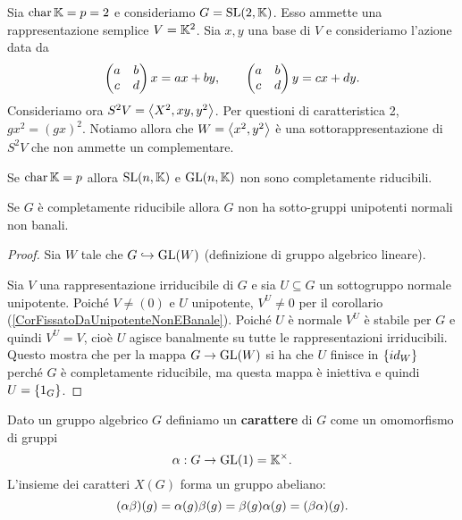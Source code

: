 \begin{example}
Sia $\operatorname{char} \mathbb{K}=p=2$ e consideriamo $G=\mathrm{SL}(2,\mathbb{K})$. Esso ammette una rappresentazione semplice $V=\mathbb{K}^2$. Sia $x,y$ una base di $V$ e consideriamo l'azione data da
\[\begin{pmatrix}a&b\\c&d\end{pmatrix}x=ax+by,\qquad \begin{pmatrix}a&b\\c&d\end{pmatrix}y=cx+dy.\]
Consideriamo ora $S^2V=\left\langle {X^2,xy,y^2}\right\rangle$. Per questioni di caratteristica 2, $gx^2=(gx)^2$. Notiamo allora che $W=\left\langle {x^2,y^2}\right\rangle$ \`e una sottorappresentazione di $S^2V$ che non ammette un complementare.
\end{example}

\begin{exercise}
Se $\operatorname{char} \mathbb{K}=p$ allora $\mathrm{SL}(n,\mathbb{K})$ e $\mathrm{GL}(n,\mathbb{K})$ non sono completamente riducibili.
\end{exercise}




\begin{proposition}\label{PrCompletamenteRiducibileNonHaSottogruppiNormaliUnipotenti}
Se $G$ \`e completamente riducibile allora $G$ non ha sotto-gruppi unipotenti normali non banali.
\end{proposition}
\begin{proof}
Sia $W$ tale che $G\hookrightarrow \mathrm{GL}(W)$ (definizione di gruppo algebrico lineare).

Sia $V$ una rappresentazione irriducibile di $G$ e sia $U\subseteq G$ un sottogruppo normale unipotente. Poich\'e $V\neq (0)$ e $U$ unipotente, $V^U\neq 0$ per il corollario (\ref{CorFissatoDaUnipotenteNonEBanale}). Poich\'e $U$ \`e normale $V^U$ \`e stabile per $G$ e quindi $V^U=V$, cio\`e $U$ agisce banalmente su tutte le rappresentazioni irriducibili. Questo mostra che per la mappa $G\to \mathrm{GL}(W)$ si ha che $U$ finisce in $\left\{{id_W}\right\}$ perch\'e $G$ \`e completamente riducibile, ma questa mappa \`e iniettiva e quindi $U=\left\{{1_G}\right\}$.
\end{proof}



\begin{definition}
Dato un gruppo algebrico $G$ definiamo un \textbf{carattere} di $G$ come un omomorfismo di gruppi
\[\alpha:G\to \mathrm{GL}(1)=\mathbb{K}^\times.\]
L'insieme dei caratteri $X(G)$ forma un gruppo abeliano:
\[(\alpha\beta)(g)=\alpha(g)\beta(g)=\beta(g)\alpha(g)=(\beta\alpha)(g).\]
\end{definition}

